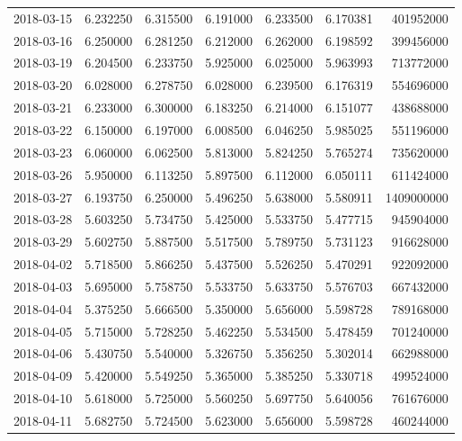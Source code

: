\begin{tabular}{lrrrrrr}
2018-03-15 &    6.232250 &    6.315500 &    6.191000 &    6.233500 &    6.170381 &   401952000 \\
2018-03-16 &    6.250000 &    6.281250 &    6.212000 &    6.262000 &    6.198592 &   399456000 \\
2018-03-19 &    6.204500 &    6.233750 &    5.925000 &    6.025000 &    5.963993 &   713772000 \\
2018-03-20 &    6.028000 &    6.278750 &    6.028000 &    6.239500 &    6.176319 &   554696000 \\
2018-03-21 &    6.233000 &    6.300000 &    6.183250 &    6.214000 &    6.151077 &   438688000 \\
2018-03-22 &    6.150000 &    6.197000 &    6.008500 &    6.046250 &    5.985025 &   551196000 \\
2018-03-23 &    6.060000 &    6.062500 &    5.813000 &    5.824250 &    5.765274 &   735620000 \\
2018-03-26 &    5.950000 &    6.113250 &    5.897500 &    6.112000 &    6.050111 &   611424000 \\
2018-03-27 &    6.193750 &    6.250000 &    5.496250 &    5.638000 &    5.580911 &  1409000000 \\
2018-03-28 &    5.603250 &    5.734750 &    5.425000 &    5.533750 &    5.477715 &   945904000 \\
2018-03-29 &    5.602750 &    5.887500 &    5.517500 &    5.789750 &    5.731123 &   916628000 \\
2018-04-02 &    5.718500 &    5.866250 &    5.437500 &    5.526250 &    5.470291 &   922092000 \\
2018-04-03 &    5.695000 &    5.758750 &    5.533750 &    5.633750 &    5.576703 &   667432000 \\
2018-04-04 &    5.375250 &    5.666500 &    5.350000 &    5.656000 &    5.598728 &   789168000 \\
2018-04-05 &    5.715000 &    5.728250 &    5.462250 &    5.534500 &    5.478459 &   701240000 \\
2018-04-06 &    5.430750 &    5.540000 &    5.326750 &    5.356250 &    5.302014 &   662988000 \\
2018-04-09 &    5.420000 &    5.549250 &    5.365000 &    5.385250 &    5.330718 &   499524000 \\
2018-04-10 &    5.618000 &    5.725000 &    5.560250 &    5.697750 &    5.640056 &   761676000 \\
2018-04-11 &    5.682750 &    5.724500 &    5.623000 &    5.656000 &    5.598728 &   460244000 \\

\end{tabular}
